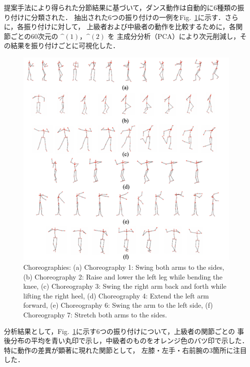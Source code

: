 \documentclass[conference]{IEEEtran}
\begin{document}
提案手法により得られた分節結果に基づいて，ダンス動作は自動的に6種類の振り付けに分類された．
抽出された6つの振り付けの一例をFig.~\ref{fig:choreography}に示す．さらに，各振り付けに対して，
上級者および中級者の動作を比較するために，各関節ごとの60次元の $\bm^{(1)}$，$\bm^{(2)}$ を
主成分分析（PCA）により次元削減し，その結果を振り付けごとに可視化した．
%
\begin{figure}[t]
	\centering
	\includegraphics[scale=0.3]{fig/choreography.pdf}
	\caption{Choreographies: (a) Choreography 1: Swing both arms to the sides, 
  (b) Choreography 2: Raise and lower the left leg while bending the knee, 
  (c) Choreography 3: Swing the right arm back and forth while lifting the right heel, 
  (d) Choreography 4: Extend the left arm forward, 
  (e) Choreography 6: Swing the arm to the left side, 
  (f) Choreography 7: Stretch both arms to the sides.}
	\label{fig:choreography}
	\vspace{-0.4cm}
\end{figure}
%
分析結果として，Fig.~\ref{fig:choreography}に示す6つの振り付けについて，上級者の関節ごとの
事後分布の平均を青い丸印で示し，中級者のものをオレンジ色のバツ印で示した．特に動作の差異が顕著に現れた関節として，
左膝・左手・右前腕の3箇所に注目した．
\end{document}
